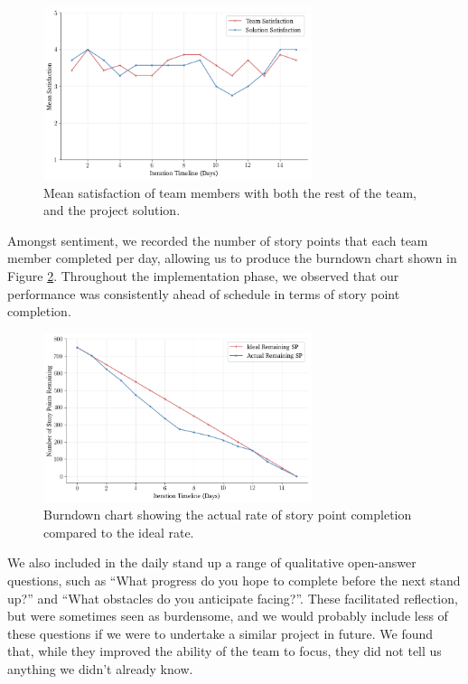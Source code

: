\begin{figure}[h!]
	\centering
	\includegraphics[width=0.7\textwidth]{images/plot_satisfaction}
	\caption{Mean satisfaction of team members with both the rest of the team, and the project solution.}
	\label{fig:plot_satisfaction}
\end{figure}

\newpage
Amongst sentiment, we recorded the number of story points that each team member completed per day, allowing us to produce the burndown chart shown in Figure \ref{fig:plot_story_points}. Throughout the implementation phase, we observed that our performance was consistently ahead of schedule in terms of story point completion.

\begin{figure}[h!]
	\centering
	\includegraphics[width=0.7\textwidth]{images/plot_story_points}
	\caption{Burndown chart showing the actual rate of story point completion compared to the ideal rate.}
	\label{fig:plot_story_points}
\end{figure}

We also included in the daily stand up a range of qualitative open-answer questions, such as “What progress do you hope to complete before the next stand up?” and “What obstacles do you anticipate facing?”. These facilitated reflection, but were sometimes seen as burdensome, and we would probably include less of these questions if we were to undertake a similar project in future. We found that, while they improved the ability of the team to focus, they did not tell us anything we didn’t already know.


